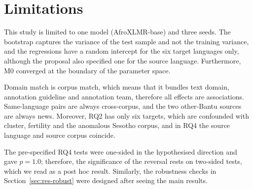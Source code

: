 \section{Limitations}\label{sec:limitations}
This study is limited to one model (AfroXLMR-base) and three seeds. The bootstrap captures the variance of the test sample and not the training variance, and the regressions have a random intercept for the six target languages only, although the proposal also specified one for the source language. Furthermore, M0 converged at the boundary of the parameter space.

Domain match is corpus match, which means that it bundles text domain, annotation guideline and annotation team, therefore all effects are associations. Same-language pairs are always cross-corpus, and the two other-Bantu sources are always news. Moreover, RQ2 has only six targets, which are confounded with cluster, fertility and the anomalous Sesotho corpus, and in RQ4 the source language and source corpus coincide.

The pre-specified RQ4 tests were one-sided in the hypothesised direction and gave $p=1.0$; therefore, the significance of the reversal rests on two-sided tests, which we read as a post hoc result. Similarly, the robustness checks in Section~\ref{sec:res-robust} were designed after seeing the main results.
